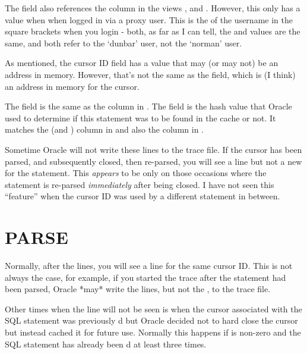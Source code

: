 The  field also references the column  in the views ,  and . However, this only has a value when when logged in via a proxy user. This is the  of the username in the square brackets when you login -  both, as far as I can tell, the  and  values are the same, and both refer to the `dunbar' user, not the `norman' user.

As mentioned, the cursor ID field has a value that may (or may not) be an address in memory. However, that's not the same as the  field, which is (I think) an address in memory for the cursor.

The  field is the same as the  column in . The  field is the hash value that Oracle used to determine if this statement was to be found in the cache or not. It matches the  (and ) column in  and also the  column in .

Sometime Oracle will not write these lines to the trace file. If the cursor has been parsed, and subsequently closed, then re-parsed, you will see a  line but not a new  for the statement. This \emph{appears} to be only on those occasions where the statement is re-parsed \emph{immediately} after being closed. I have not seen this ``feature'' when the cursor ID was used by a different statement in between.

\newpage\section{PARSE}\label{parse}

Normally, after the  lines, you will see a  line for the same cursor ID. This is not always the case, for example, if you started the trace after the statement had been parsed, Oracle *may* write the  lines, but not the , to the trace file.

Other times when the  line will not be seen is when the cursor associated with the SQL statement was previously d but Oracle decided not to hard close the cursor but instead cached it for future use. Normally this happens if  is non-zero and the SQL statement has already been d at least three times.

